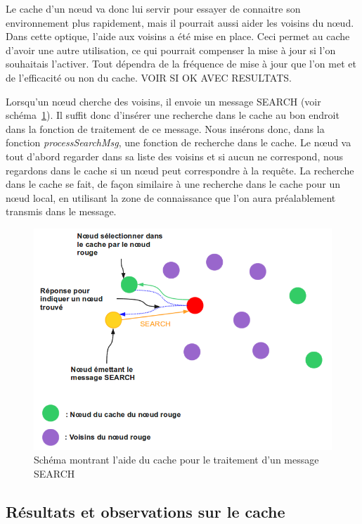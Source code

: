 Le cache d'un nœud va donc lui servir pour essayer de connaitre son environnement plus rapidement, mais il pourrait aussi aider les voisins du nœud. Dans cette optique, l'aide aux voisins a été mise en place. Ceci permet au cache d'avoir une autre utilisation, ce qui pourrait compenser la mise à jour si l'on souhaitais l'activer. Tout dépendra de la fréquence de mise à jour que l'on met et de l'efficacité ou non du cache. VOIR SI OK AVEC RESULTATS.
\par Lorsqu'un nœud cherche des voisins, il envoie un message SEARCH (voir schéma~\ref{schemaHelpCache}). Il suffit donc d'insérer une recherche dans le cache au bon endroit dans la fonction de traitement de ce message. Nous insérons donc, dans la fonction \textit{processSearchMsg}, une fonction de recherche dans le cache. Le nœud va tout d'abord regarder dans sa liste des voisins et si aucun ne correspond, nous regardons dans le cache si un nœud peut correspondre à la requête. La recherche dans le cache se fait, de façon similaire à une recherche dans le cache pour un nœud local, en utilisant la zone de connaissance que l'on aura préalablement transmis dans le message.

	\begin{figure}[!h]
        \centering
        \includegraphics[scale=0.4]{./Ressources/Images/cacheHelp.png}
        \caption{Schéma montrant l'aide du cache pour le traitement d'un message SEARCH}
        \label{schemaHelpCache}
        \end{figure}


\subsection{Résultats et observations sur le cache}
\label{resObsCache}

